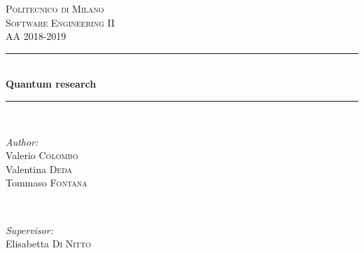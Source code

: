\documentclass[12pt]{article}
\begin{document}
\begin{titlepage}

\newcommand{\HRule}{\rule{\linewidth}{0.5mm}} %

\center %
 

\textsc{\LARGE Politecnico di Milano}\\[1.5cm] %
\textsc{\Large Software Engineering II}\\[0.5cm] %
\textsc{\large AA 2018-2019}\\[0.5cm] %


\HRule \\[0.4cm]
{ \huge \bfseries Quantum research}\\[0.4cm] %
\HRule \\[1.5cm]
 

\begin{minipage}{0.4\textwidth}
\begin{flushleft} \large
\emph{Author:}\\
Valerio \textsc{Colombo}\\
Valentina \textsc{Deda}\\
Tommaso \textsc{Fontana}
\end{flushleft}
\end{minipage}
~
\begin{minipage}{0.4\textwidth}
\begin{flushright} \large
\emph{Supervisor:} \\
Elisabetta \textsc{Di Nitto} %
\end{flushright}

\end{minipage}\\[2cm]


\end{titlepage}
\end{document}
